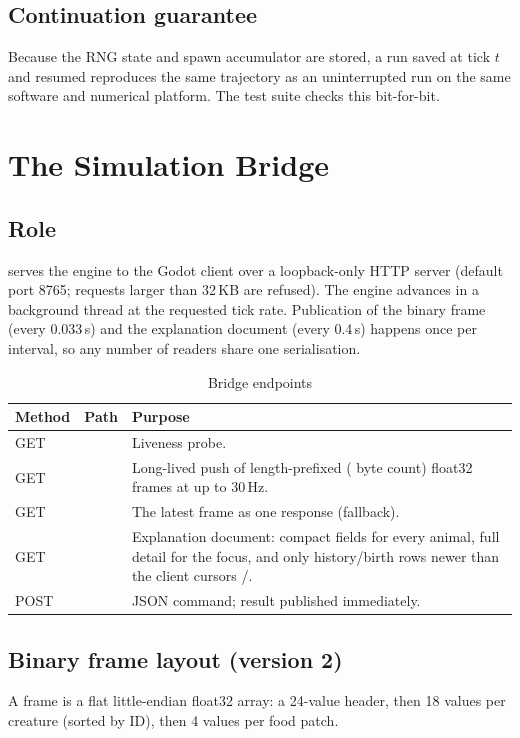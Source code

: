 \section{Continuation guarantee}
Because the RNG state and spawn accumulator are stored, a run saved at tick $t$
and resumed reproduces the same trajectory as an uninterrupted run on the same
software and numerical platform. The test suite checks this bit-for-bit.

\chapter{The Simulation Bridge}

\section{Role}
 serves the engine to the Godot client over a loopback-only HTTP
server (default port 8765; requests larger than 32\,KB are refused). The engine
advances in a background thread at the requested tick rate. Publication of the
binary frame (every 0.033\,s) and the explanation document (every 0.4\,s) happens
once per interval, so any number of readers share one serialisation.

\begin{table}[htbp]
\centering
\caption{Bridge endpoints}
\begin{tabularx}{\textwidth}{llL}
\toprule
Method & Path & Purpose \\
\midrule
GET &  & Liveness probe. \\
GET &  & Long-lived push of length-prefixed ( byte count) float32 frames at up to 30\,Hz. \\
GET &  & The latest frame as one response (fallback). \\
GET &  & Explanation document: compact fields for every animal, full detail for the focus, and only history/birth rows newer than the client cursors /. \\
POST &  & JSON command; result published immediately. \\
\bottomrule
\end{tabularx}
\end{table}

\section{Binary frame layout (version 2)}
A frame is a flat little-endian float32 array: a 24-value header, then 18 values
per creature (sorted by ID), then 4 values per food patch.

